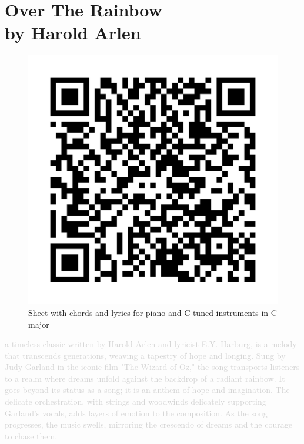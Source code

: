 \chapter[Over The Rainbow]{Over The Rainbow\\[1ex]\large{by Harold Arlen}}

\begin{figure}
\includegraphics[width=1\linewidth]{QR_Codes/QR_OverTheRainbow_C.png}\\
Sheet with chords and lyrics for piano and C tuned instruments in C major
\end{figure}

\textcolor{lightgray}{a timeless classic written by Harold Arlen and lyricist E.Y. Harburg, is a melody that transcends generations, weaving a tapestry of hope and longing. Sung by Judy Garland in the iconic film "The Wizard of Oz," the song transports listeners to a realm where dreams unfold against the backdrop of a radiant rainbow.
It goes beyond its status as a song; it is an anthem of hope and imagination. The delicate orchestration, with strings and woodwinds delicately supporting Garland's vocals, adds layers of emotion to the composition. As the song progresses, the music swells, mirroring the crescendo of dreams and the courage to chase them.}\\


